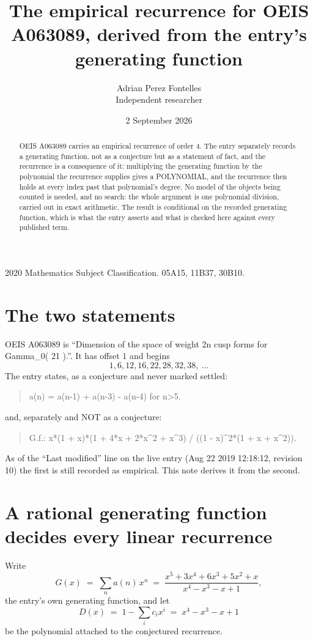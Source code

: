 \documentclass[11pt,a4paper]{article}
\title{The empirical recurrence for OEIS A063089, derived from the entry's generating function}
\author{Adrian Perez Fontelles\\ \small Independent researcher}
\date{2 September 2026}
\theoremstyle{plain}
\theoremstyle{definition}
\begin{document}
\maketitle

\begin{abstract}
OEIS A063089 carries an empirical recurrence of order $4$. The entry separately records a
generating function, not as a conjecture but as a statement of fact, and the recurrence is a
consequence of it: multiplying the generating function by the polynomial the recurrence
supplies gives a POLYNOMIAL, and the recurrence then holds at every index past that
polynomial's degree. No model of the objects being counted is needed, and no search: the
whole argument is one polynomial division, carried out in exact arithmetic. The result is
conditional on the recorded generating function, which is what the entry asserts and what is
checked here against every published term.
\end{abstract}

\noindent\small 2020 Mathematics Subject Classification. 05A15, 11B37, 30B10.\normalsize

\section{The two statements}

OEIS A063089 is ``Dimension of the space of weight 2n cusp forms for Gamma\_0( 21 ).''. It has offset $1$ and begins
\[
1, 6, 12, 16, 22, 28, 32, 38,\ \dots
\]
The entry states, as a conjecture and never marked settled:
\begin{quote}
a(n) = a(n-1) + a(n-3) - a(n-4) for n>5.
\end{quote}
and, separately and NOT as a conjecture:
\begin{quote}
G.f.: x*(1 + x)*(1 + 4*x + 2*x\^{}2 + x\^{}3) / ((1 - x)\^{}2*(1 + x + x\^{}2)).
\end{quote}
As of the ``Last modified'' line on the live entry (Aug 22 2019 12:18:12, revision 10) the first is still
recorded as empirical. This note derives it from the second.

\section{A rational generating function decides every linear recurrence}

Write
\[
G(x)\;=\;\sum_{n}a(n)\,x^{n}\;=\;\frac{x^{5} + 3 x^{4} + 6 x^{3} + 5 x^{2} + x}{x^{4} - x^{3} - x + 1},
\]
the entry's own generating function, and let
\[
D(x)\;=\;1-\sum_i c_i x^{i}\;=\;x^{4} - x^{3} - x + 1
\]
be the polynomial attached to the conjectured recurrence.
\end{document}
